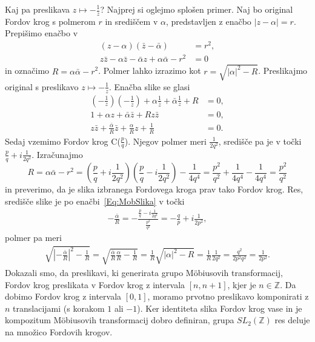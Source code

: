 \documentclass[mat1]{fmfdelo}
\begin{document}
\begin{dokaz}
Kaj pa preslikava $z \mapsto -\frac{1}{z}$? Najprej si oglejmo splošen primer. Naj bo original Fordov krog s polmerom $r$ in središčem v $\alpha$, predstavljen z enačbo $ |z-\alpha|=r$. Prepišimo enačbo v
\begin{align}
(z-\alpha)( \bar{z}-\bar{\alpha}) &= r^2, \nonumber \\
z\bar{z} - \alpha \bar{z} - \bar{\alpha} z + \alpha \bar{\alpha} - r^2 &= 0
\end{align}
in označimo $R = \alpha \bar{\alpha} - r^2$. Polmer lahko izrazimo kot $r = \sqrt{|\alpha|^2-R}$.
%
Preslikajmo original s preslikavo $z \mapsto -\frac{1}{z}$. Enačba slike se glasi
\begin{align}
\label{Eq:MobSlika}
\left(-\frac{1}{z}\right)\left(-\frac{1}{\bar{z}}\right) + \alpha \frac{1}{\bar{z}} + \bar{\alpha} \frac{1}{z} + R &= 0, \nonumber \\
1 + \alpha z + \bar{\alpha} \bar{z} + Rz \bar{z} &= 0, \nonumber \\
z \bar{z} + \frac{\bar{\alpha}}{R} \bar{z} + \frac{\alpha}{R} z + \frac{1}{R} &= 0.
\end{align}
%
Sedaj vzemimo Fordov krog C($\frac{p}{q}$). Njegov polmer meri $\frac{1}{2q^2}$, središče pa je v točki $\frac{p}{q} +i \frac{1}{2q^2}$.
Izračunajmo
\[ R = \alpha \bar{\alpha} - r^2 = \left(\frac{p}{q} + i\frac{1}{2q^2} \right) \left(\frac{p}{q} - i\frac{1}{2q^2} \right) - \frac{1}{4q^4} 
= \frac{p^2}{q^2} + \frac{1}{4q^4} - \frac{1}{4q^4} = \frac{p^2}{q^2} \]
in preverimo, da je slika izbranega Fordovega kroga prav tako Fordov krog. Res, središče slike je po enačbi~\eqref{Eq:MobSlika} v točki
\begin{align}
-\frac{\bar{\alpha}}{R} = - \frac{\frac{p}{q} - i \frac{1}{2q^2}}{\frac{p^2}{q^2}} = - \frac{q}{p} + i \frac{1}{2p^2},
\end{align}
polmer pa meri
\begin{align}
\sqrt{ \left| - \frac{\bar{\alpha}}{R} \right|^2 - \frac{1}{R} } = \sqrt{ \frac{\bar{\alpha}}{R} \frac{\alpha}{R} - \frac{1}{R} } 
= \frac{1}{R} \sqrt{|\alpha|^2 - R} =  \frac{1}{R} \frac{1}{2q^2} = \frac{q^2}{2p^2 q^2} = \frac{1}{2p^2}.
\end{align}
%
Dokazali smo, da preslikavi, ki generirata grupo M\"{o}biusovih transformacij, Fordov krog preslikata v Fordov krog z intervala $[n,n+1]$, kjer je $n \in \mathbb{Z}$. Da dobimo Fordov krog z intervala $[0,1]$, moramo prvotno preslikavo komponirati z $n$ translacijami (s korakom $1$ ali $-1$). Ker identiteta slika Fordov krog vase in je kompozitum M\"{o}biusovih transformacij dobro definiran, grupa ${SL}_{2}(\mathbb{Z})$ res deluje na množico Fordovih krogov.
\end{dokaz}
\end{document}
